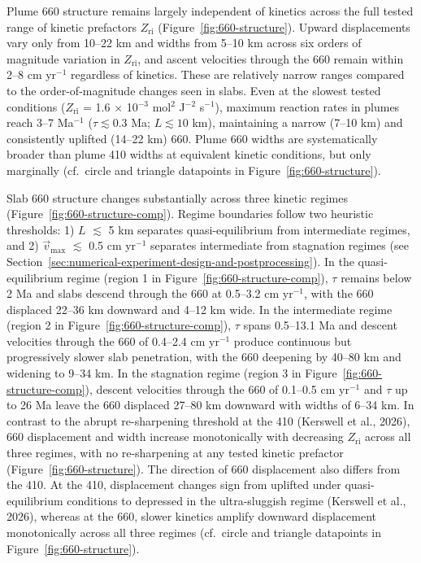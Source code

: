 \documentclass[draft,linenumbers]{agujournal2019}
\begin{document}
Plume 660 structure remains largely independent of kinetics across the
full tested range of kinetic prefactors \(Z_\mathrm{ri}\)
(Figure~\ref{fig:660-structure}). Upward displacements vary only from
10--22 km and widths from 5--10 km across six orders of magnitude
variation in \(Z_\mathrm{ri}\), and ascent velocities through the 660
remain within 2--8 cm yr\(^{-1}\) regardless of kinetics. These are
relatively narrow ranges compared to the order-of-magnitude changes seen
in slabs. Even at the slowest tested conditions (\(Z_\mathrm{ri}\) = 1.6
\(\times\) 10\(^{-3}\) mol\(^2\) J\(^{-2}\) s\(^{-1}\)), maximum
reaction rates in plumes reach 3--7 Ma\(^{-1}\) (\(\tau \lesssim 0.3\)
Ma; \(L \lesssim 10\) km), maintaining a narrow (7--10 km) and
consistently uplifted (14--22 km) 660. Plume 660 widths are
systematically broader than plume 410 widths at equivalent kinetic
conditions, but only marginally (cf.~circle and triangle datapoints in
Figure~\ref{fig:660-structure}).

Slab 660 structure changes substantially across three kinetic regimes
(Figure~\ref{fig:660-structure-comp}). Regime boundaries follow two
heuristic thresholds: 1) \(L\) \(\lesssim\) 5 km separates
quasi-equilibrium from intermediate regimes, and 2)
\(\vec{v}_\mathrm{max}\) \(\lesssim\) 0.5 cm yr\(^{-1}\) separates
intermediate from stagnation regimes (see
Section~\ref{sec:numerical-experiment-design-and-postprocessing}). In
the quasi-equilibrium regime (region 1 in
Figure~\ref{fig:660-structure-comp}), \(\tau\) remains below 2 Ma and
slabs descend through the 660 at 0.5--3.2 cm yr\(^{-1}\), with the 660
displaced 22--36 km downward and 4--12 km wide. In the intermediate
regime (region 2 in Figure~\ref{fig:660-structure-comp}), \(\tau\) spans
0.5--13.1 Ma and descent velocities through the 660 of 0.4--2.4 cm
yr\(^{-1}\) produce continuous but progressively slower slab
penetration, with the 660 deepening by 40--80 km and widening to 9--34
km. In the stagnation regime (region 3 in
Figure~\ref{fig:660-structure-comp}), descent velocities through the 660
of 0.1--0.5 cm yr\(^{-1}\) and \(\tau\) up to 26 Ma leave the 660
displaced 27--80 km downward with widths of 6--34 km. In contrast to the
abrupt re-sharpening threshold at the 410 (Kerswell et al., 2026), 660
displacement and width increase monotonically with decreasing
\(Z_\mathrm{ri}\) across all three regimes, with no re-sharpening at any
tested kinetic prefactor (Figure~\ref{fig:660-structure}). The direction
of 660 displacement also differs from the 410. At the 410, displacement
changes sign from uplifted under quasi-equilibrium conditions to
depressed in the ultra-sluggish regime (Kerswell et al., 2026), whereas
at the 660, slower kinetics amplify downward displacement monotonically
across all three regimes (cf.~circle and triangle datapoints in
Figure~\ref{fig:660-structure}).
\end{document}
